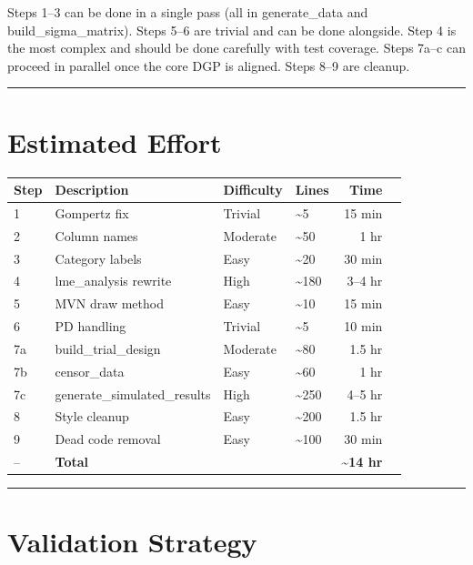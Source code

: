 \documentclass[11pt]{article}
\begin{document}
Steps 1--3 can be done in a single pass (all in generate\_data
and build\_sigma\_matrix). Steps 5--6 are trivial and can be done
alongside. Step 4 is the most complex and should be done
carefully with test coverage. Steps 7a--c can proceed in parallel
once the core DGP is aligned. Steps 8--9 are cleanup.

\bigskip\noindent\rule{\textwidth}{0.4pt}\bigskip

\section{Estimated Effort}

\begin{table}[h]
\centering
\begin{tabular}{llllrr}
\toprule
Step & Description & Difficulty & Lines & Time \\
\midrule
1 & Gompertz fix & Trivial & \textasciitilde 5 & 15 min \\
2 & Column names & Moderate & \textasciitilde 50 & 1 hr \\
3 & Category labels & Easy & \textasciitilde 20 & 30 min \\
4 & lme\_analysis rewrite & High & \textasciitilde 180 & 3--4 hr \\
5 & MVN draw method & Easy & \textasciitilde 10 & 15 min \\
6 & PD handling & Trivial & \textasciitilde 5 & 10 min \\
7a & build\_trial\_design & Moderate & \textasciitilde 80 & 1.5 hr \\
7b & censor\_data & Easy & \textasciitilde 60 & 1 hr \\
7c & generate\_simulated\_results & High & \textasciitilde 250 & 4--5 hr \\
8 & Style cleanup & Easy & \textasciitilde 200 & 1.5 hr \\
9 & Dead code removal & Easy & \textasciitilde 100 & 30 min \\
\midrule
-- & \textbf{Total} & & & \textbf{\textasciitilde 14 hr} \\
\bottomrule
\end{tabular}
\end{table}

\bigskip\noindent\rule{\textwidth}{0.4pt}\bigskip

\section{Validation Strategy}
\end{document}
